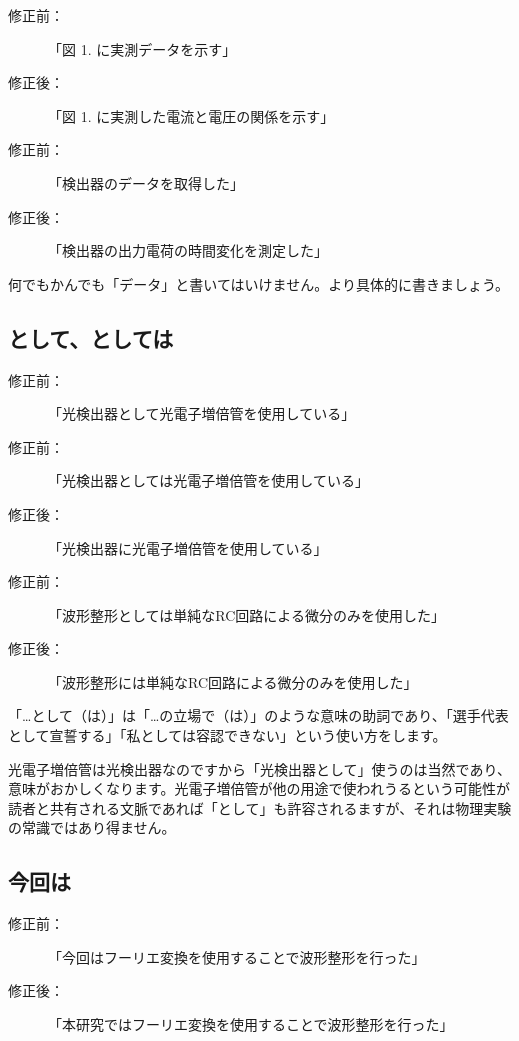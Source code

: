 \begin{description}
\item[修正前：]「図 1. に実測データを示す」
\item[修正後：]「図 1. に実測した電流と電圧の関係を示す」
\end{description}
\begin{description}
\item[修正前：]「検出器のデータを取得した」
\item[修正後：]「検出器の出力電荷の時間変化を測定した」
\end{description}

何でもかんでも「データ」と書いてはいけません。より具体的に書きましょう。

\subsection{として、としては}

\begin{description}
\item[修正前：]「光検出器として光電子増倍管を使用している」
\item[修正前：]「光検出器としては光電子増倍管を使用している」
\item[修正後：]「光検出器に光電子増倍管を使用している」
\end{description}

\begin{description}
\item[修正前：]「波形整形としては単純なRC回路による微分のみを使用した」
\item[修正後：]「波形整形には単純なRC回路による微分のみを使用した」
\end{description}

「…として（は）」は「…の立場で（は）」のような意味の助詞であり、「選手代表として宣誓する」「私としては容認できない」という使い方をします。

光電子増倍管は光検出器なのですから「光検出器として」使うのは当然であり、意味がおかしくなります。光電子増倍管が他の用途で使われうるという可能性が読者と共有される文脈であれば「として」も許容されるますが、それは物理実験の常識ではあり得ません。

\subsection{今回は}

\begin{description}
\item[修正前：]「今回はフーリエ変換を使用することで波形整形を行った」
\item[修正後：]「本研究ではフーリエ変換を使用することで波形整形を行った」
\end{description}

